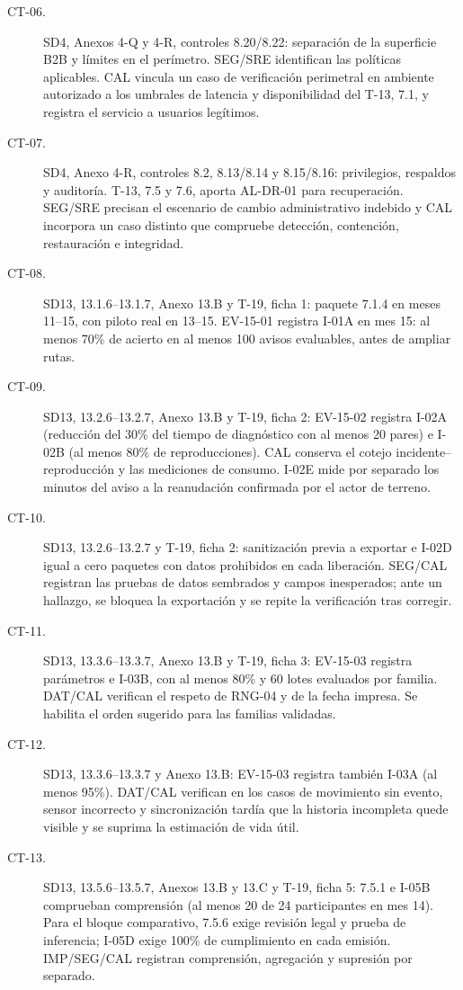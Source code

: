 \begin{description}
\item[CT-06.] SD4, Anexos 4-Q y 4-R, controles 8.20/8.22: separación de la superficie B2B y límites en el perímetro. SEG/SRE identifican las políticas aplicables. CAL vincula un caso de verificación perimetral en ambiente autorizado a los umbrales de latencia y disponibilidad del T-13, 7.1, y registra el servicio a usuarios legítimos.
\item[CT-07.] SD4, Anexo 4-R, controles 8.2, 8.13/8.14 y 8.15/8.16: privilegios, respaldos y auditoría. T-13, 7.5 y 7.6, aporta AL-DR-01 para recuperación. SEG/SRE precisan el escenario de cambio administrativo indebido y CAL incorpora un caso distinto que compruebe detección, contención, restauración e integridad.
\item[CT-08.] SD13, 13.1.6--13.1.7, Anexo 13.B y T-19, ficha 1: paquete 7.1.4 en meses 11--15, con piloto real en 13--15. EV-15-01 registra I-01A en mes 15: al menos 70\% de acierto en al menos 100 avisos evaluables, antes de ampliar rutas.
\item[CT-09.] SD13, 13.2.6--13.2.7, Anexo 13.B y T-19, ficha 2: EV-15-02 registra I-02A (reducción del 30\% del tiempo de diagnóstico con al menos 20 pares) e I-02B (al menos 80\% de reproducciones). CAL conserva el cotejo incidente--reproducción y las mediciones de consumo. I-02E mide por separado los minutos del aviso a la reanudación confirmada por el actor de terreno.
\item[CT-10.] SD13, 13.2.6--13.2.7 y T-19, ficha 2: sanitización previa a exportar e I-02D igual a cero paquetes con datos prohibidos en cada liberación. SEG/CAL registran las pruebas de datos sembrados y campos inesperados; ante un hallazgo, se bloquea la exportación y se repite la verificación tras corregir.
\item[CT-11.] SD13, 13.3.6--13.3.7, Anexo 13.B y T-19, ficha 3: EV-15-03 registra parámetros e I-03B, con al menos 80\% y 60 lotes evaluados por familia. DAT/CAL verifican el respeto de RNG-04 y de la fecha impresa. Se habilita el orden sugerido para las familias validadas.
\item[CT-12.] SD13, 13.3.6--13.3.7 y Anexo 13.B: EV-15-03 registra también I-03A (al menos 95\%). DAT/CAL verifican en los casos de movimiento sin evento, sensor incorrecto y sincronización tardía que la historia incompleta quede visible y se suprima la estimación de vida útil.
\item[CT-13.] SD13, 13.5.6--13.5.7, Anexos 13.B y 13.C y T-19, ficha 5: 7.5.1 e I-05B comprueban comprensión (al menos 20 de 24 participantes en mes 14). Para el bloque comparativo, 7.5.6 exige revisión legal y prueba de inferencia; I-05D exige 100\% de cumplimiento en cada emisión. IMP/SEG/CAL registran comprensión, agregación y supresión por separado.

\end{description}
